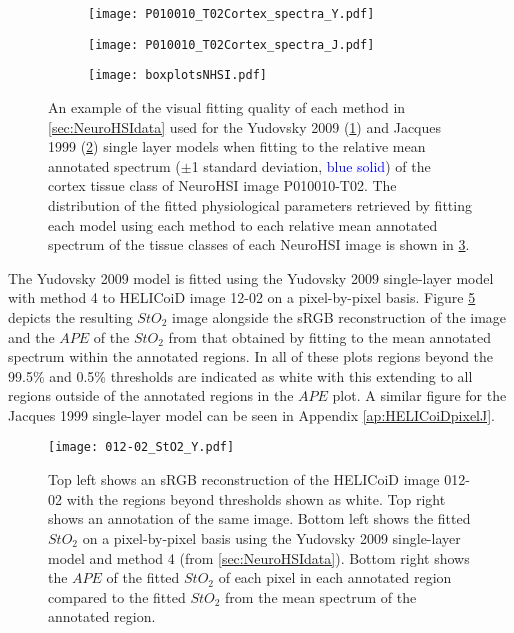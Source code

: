 \begin{figure}[h!]
    \centering
    \begin{subfigure}{0.49\textwidth}
        \texttt{[image: P010010\_T02Cortex\_spectra\_Y.pdf]}
        \caption{}
        \label{fig:backwardsHSINHSIY}
    \end{subfigure}
    \begin{subfigure}{0.49\textwidth}
        \texttt{[image: P010010\_T02Cortex\_spectra\_J.pdf]}
        \caption{}
        \label{fig:backwardsHSINHSIJ}
    \end{subfigure}
    \begin{subfigure}{\textwidth}
        \texttt{[image: boxplotsNHSI.pdf]}
        \caption{}
        \label{fig:boxplotsNHSI}
    \end{subfigure}
    \caption{An example of the visual fitting quality of each method in \ref{sec:NeuroHSIdata} used for the Yudovsky 2009 (\ref{fig:backwardsHSINHSIY}) and Jacques 1999 (\ref{fig:backwardsHSINHSIJ}) single layer models when fitting to the relative mean annotated spectrum ($\pm$1 standard deviation, \textcolor{blue}{blue solid}) of the cortex tissue class of NeuroHSI image P010010-T02. The distribution of the fitted physiological parameters retrieved by fitting each model using each method to each relative mean annotated spectrum of the tissue classes of each NeuroHSI image is shown in \ref{fig:boxplotsNHSI}.}
    \label{fig:NHSIann}
\end{figure}

The Yudovsky 2009 model is fitted using the Yudovsky 2009 single-layer model with method 4 to HELICoiD image 12-02 on a pixel-by-pixel basis. Figure \ref{fig:HELICoiDpixelY} depicts the resulting $StO_2$ image alongside the sRGB reconstruction of the image and the $APE$ of the $StO_2$ from that obtained by fitting to the mean annotated spectrum within the annotated regions. In all of these plots regions beyond the 99.5\% and 0.5\% thresholds are indicated as white with this extending to all regions outside of the annotated regions in the $APE$ plot. A similar figure for the Jacques 1999 single-layer model can be seen in Appendix \ref{ap:HELICoiDpixelJ}.

\begin{figure}[h!]
    \centering 
    \texttt{[image: 012-02\_StO2\_Y.pdf]}
    \caption{Top left shows an sRGB reconstruction of the HELICoiD image 012-02 with the regions beyond thresholds shown as white. Top right shows an annotation of the same image. Bottom left shows the fitted $StO_2$ on a pixel-by-pixel basis using the Yudovsky 2009 single-layer model and method 4 (from \ref{sec:NeuroHSIdata}). Bottom right shows the $APE$ of the fitted $StO_2$ of each pixel in each annotated region compared to the fitted $StO_2$ from the mean spectrum of the annotated region.}
    \label{fig:HELICoiDpixelY}
\end{figure}

